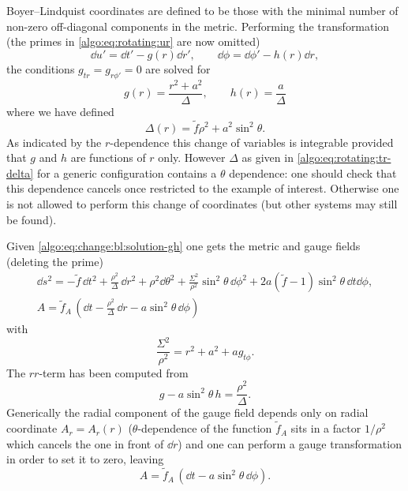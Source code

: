 Boyer--Lindquist coordinates are defined to be those with the minimal number of non-zero off-diagonal components in the metric.
Performing the transformation (the primes in \eqref{algo:eq:rotating:ur} are now omitted)
\begin{equation}
	\label{algo:eq:change:bl}
	\dd u' = \dd t' - g(r) \dd r', \qquad
	\dd \phi = \dd \phi' - h(r) \dd r,
\end{equation} 
the conditions $g_{tr} = g_{r\phi'} = 0$ are solved for
\begin{equation}
	\label{algo:eq:change:bl:solution-gh}
	g(r) = \frac{r^2 + a^2}{\Delta}, \qquad
	h(r) = \frac{a}{\Delta}
\end{equation} 
where we have defined
\begin{equation}
	\label{algo:eq:rotating:tr-delta}
	\Delta(r) = \tilde f \rho^2 + a^2 \sin^2 \theta.
\end{equation} 
As indicated by the $r$-dependence this change of variables is integrable provided that $g$ and $h$ are functions of $r$ only.
However $\Delta$ as given in \eqref{algo:eq:rotating:tr-delta} for a generic configuration contains a $\theta$ dependence: one should check that this dependence cancels once restricted to the example of interest.
Otherwise one is not allowed to perform this change of coordinates (but other systems may still be found).

Given \eqref{algo:eq:change:bl:solution-gh} one gets the metric and gauge fields (deleting the prime)
\begin{subequations}
\label{algo:eq:rotating:tr}
\begin{gather}
	\label{algo:eq:rotating:metric:tr}
	\dd s^2 = - \tilde f\, \dd t^2
		+ \frac{\rho^2}{\Delta}\, \dd r^2
		+ \rho^2 \dd\theta^2
		+ \frac{\Sigma^2}{\rho^2} \sin^2 \theta\, \dd\phi^2
		+ 2 a (\tilde f - 1) \sin^2 \theta\, \dd t \dd\phi, \\
	\label{algo:eq:rotating:vector:tr}
	A = \tilde f_A\, \left(\dd t - \frac{\rho^2}{\Delta}\, \dd r - a \sin^2 \theta\, \dd \phi \right)
\end{gather}
\end{subequations}
with
\begin{equation}
	\label{algo:eq:rotating:tr-sigma}
	\frac{\Sigma^2}{\rho^2} = r^2 + a^2 + a g_{t\phi}.
\end{equation} 
The $rr$-term has been computed from
\begin{equation}
	\label{algo:eq:g-plus-a-sin-h}
	g - a \sin^2 \theta\, h = \frac{\rho^2}{\Delta}.
\end{equation} 
Generically the radial component of the gauge field depends only on radial coordinate $A_r = A_r(r)$ ($\theta$-dependence of the function $\tilde f_A$ sits in a factor $1 / \rho^2$ which cancels the one in front of $\dd r$) and one can perform a gauge transformation in order to set it to zero, leaving
\begin{equation}
	A = \tilde f_A\, \left(\dd t - a \sin^2 \theta\, \dd \phi \right).
\end{equation} 



